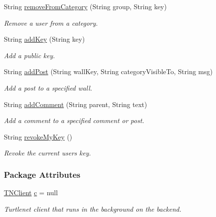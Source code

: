 \begin{DoxyCompactItemize}
String \hyperlink{classballmerpeak_1_1turtlenet_1_1server_1_1TurtlenetImpl_ae8181f4e329a9ffa1d1b4d5deebf617d}{remove\-From\-Category} (String group, String key)
\begin{DoxyCompactList}\small\item\em Remove a user from a category. \end{DoxyCompactList}\item 
String \hyperlink{classballmerpeak_1_1turtlenet_1_1server_1_1TurtlenetImpl_ac32167a339c28603b6166f7dc605f6b8}{add\-Key} (String key)
\begin{DoxyCompactList}\small\item\em Add a public key. \end{DoxyCompactList}\item 
String \hyperlink{classballmerpeak_1_1turtlenet_1_1server_1_1TurtlenetImpl_ae66b52ba9debe2a2f06e6402d485526c}{add\-Post} (String wall\-Key, String category\-Visible\-To, String msg)
\begin{DoxyCompactList}\small\item\em Add a post to a specified wall. \end{DoxyCompactList}\item 
String \hyperlink{classballmerpeak_1_1turtlenet_1_1server_1_1TurtlenetImpl_a0a6b4c30111bf1c85613b2370c20f464}{add\-Comment} (String parent, String text)
\begin{DoxyCompactList}\small\item\em Add a comment to a specified comment or post. \end{DoxyCompactList}\item 
String \hyperlink{classballmerpeak_1_1turtlenet_1_1server_1_1TurtlenetImpl_a2f380c86cd6789269b156b3a731834ae}{revoke\-My\-Key} ()
\begin{DoxyCompactList}\small\item\em Revoke the current users key. \end{DoxyCompactList}\end{DoxyCompactItemize}
\subsubsection*{Package Attributes}
\begin{DoxyCompactItemize}
\item 
\hyperlink{classballmerpeak_1_1turtlenet_1_1server_1_1TNClient}{T\-N\-Client} \hyperlink{classballmerpeak_1_1turtlenet_1_1server_1_1TurtlenetImpl_a8e8797ccc45aa68a72f8349c4eaf84ca}{c} = null
\begin{DoxyCompactList}\small\item\em Turtlenet client that runs in the background on the backend. \end{DoxyCompactList}\end{DoxyCompactItemize}


